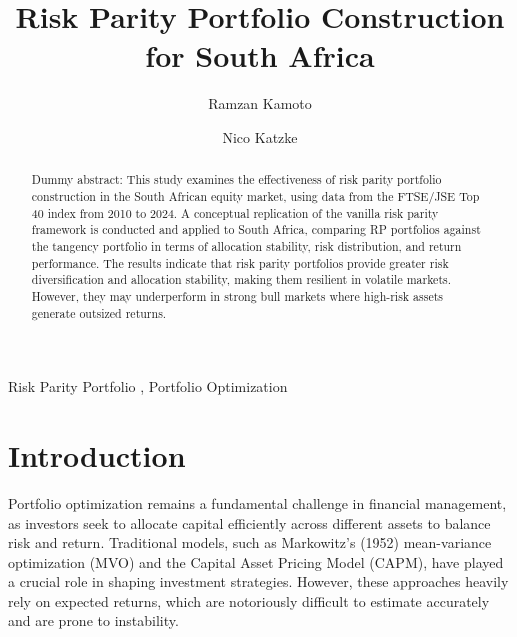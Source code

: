 \documentclass[preprint, 3p,
authoryear]{elsarticle} %
\begin{document}
\begin{frontmatter}

  \title{Risk Parity Portfolio Construction for South Africa}
    \author[Stellenbosch University]{Ramzan Kamoto%
  }
    \author[Stellenbosch University]{Nico Katzke%
  }
  
  \begin{abstract}
  Dummy abstract: This study examines the effectiveness of risk parity
  portfolio construction in the South African equity market, using data
  from the FTSE/JSE Top 40 index from 2010 to 2024. A conceptual
  replication of the vanilla risk parity framework is conducted and
  applied to South Africa, comparing RP portfolios against the tangency
  portfolio in terms of allocation stability, risk distribution, and
  return performance. The results indicate that risk parity portfolios
  provide greater risk diversification and allocation stability, making
  them resilient in volatile markets. However, they may underperform in
  strong bull markets where high-risk assets generate outsized returns.
  \end{abstract}
    \begin{keyword}
    Risk Parity Portfolio \sep 
    Portfolio Optimization
  \end{keyword}
  
 \end{frontmatter}

\hypertarget{introduction}{%
\section{Introduction}\label{introduction}}

Portfolio optimization remains a fundamental challenge in financial
management, as investors seek to allocate capital efficiently across
different assets to balance risk and return. Traditional models, such as
Markowitz's (1952) mean-variance optimization (MVO) and the Capital
Asset Pricing Model (CAPM), have played a crucial role in shaping
investment strategies. However, these approaches heavily rely on
expected returns, which are notoriously difficult to estimate accurately
and are prone to instability.
\end{document}
